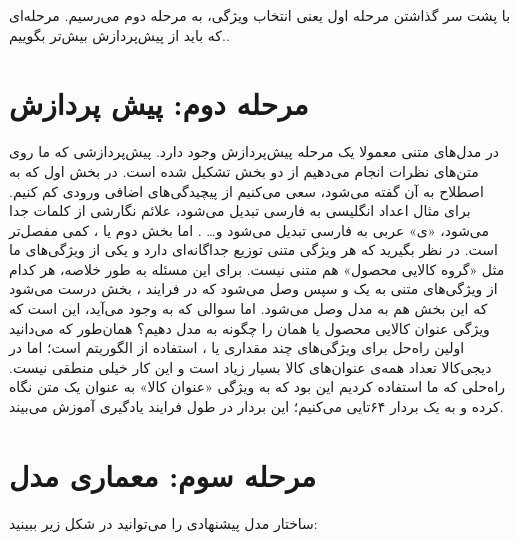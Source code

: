 با پشت سر گذاشتن مرحله اول یعنی انتخاب ویژگی، به مرحله دوم می‌رسیم. مرحله‌ای که باید از پیش‌پردازش بیش‌تر بگوییم..

\section{مرحله دوم: پیش پردازش}

در مدل‌های متنی معمولا یک مرحله پیش‌پردازش وجود دارد. پیش‌پردازشی که ما روی متن‌های نظرات انجام می‌دهیم از دو بخش تشکیل شده‌ است.
در بخش اول که به اصطلاح به آن  گفته می‌شود، سعی می‌کنیم از پیچیدگی‌های اضافی ورودی کم کنیم. برای مثال اعداد انگلیسی به فارسی تبدیل می‌شود، علائم نگارشی از کلمات جدا می‌شود، «ی» عربی به فارسی تبدیل می‌شود و… .
اما بخش دوم یا ، کمی مفصل‌تر است. در نظر بگیرید که هر ویژگی متنی توزیع جداگانه‌ای دارد و یکی از ویژگی‌های ما مثل «گروه کالایی محصول» هم متنی نیست. برای این مسئله به طور خلاصه، هر کدام از ویژگی‌های متنی به یک  و سپس  وصل می‌شود که در فرایند ، بخش  درست می‌شود که این بخش هم به  مدل وصل می‌شود.
اما سوالی که به وجود می‌آید، این است که ویژگی عنوان کالایی محصول یا همان  را چگونه به مدل دهیم؟ همان‌طور که می‌دانید اولین راه‌حل برای ویژگی‌های چند مقداری یا ، استفاده از الگوریتم
  است؛ اما در دیجی‌کالا تعداد همه‌ی عنوان‌های کالا بسیار زیاد است و این کار خیلی منطقی نیست. 
راه‌حلی که ما استفاده کردیم این بود که به ویژگی «عنوان کالا» به عنوان یک متن نگاه کرده و به یک بردار ۶۴تایی 
 می‌کنیم؛ این بردار در طول فرایند یادگیری آموزش می‌بیند.

\section{مرحله سوم: معماری مدل}
ساختار مدل پیشنهادی را می‌توانید در شکل زیر ببینید:

